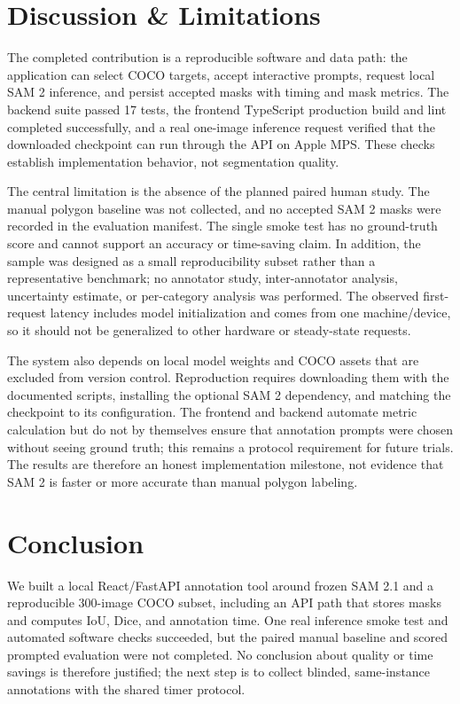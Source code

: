 \documentclass[11pt]{article}
\begin{document}
\section{Discussion \& Limitations}
\label{sec:discussion}
The completed contribution is a reproducible software and data path: the
application can select COCO targets, accept interactive prompts, request local
SAM 2 inference, and persist accepted masks with timing and mask metrics. The
backend suite passed 17 tests, the frontend TypeScript production build and
lint completed successfully, and a real one-image inference request verified
that the downloaded checkpoint can run through the API on Apple MPS. These
checks establish implementation behavior, not segmentation quality.

The central limitation is the absence of the planned paired human study. The
manual polygon baseline was not collected, and no accepted SAM 2 masks were
recorded in the evaluation manifest. The single smoke test has no ground-truth
score and cannot support an accuracy or time-saving claim. In addition, the
sample was designed as a small reproducibility subset rather than a
representative benchmark; no annotator study, inter-annotator analysis,
uncertainty estimate, or per-category analysis was performed. The observed
first-request latency includes model initialization and comes from one
machine/device, so it should not be generalized to other hardware or
steady-state requests.

The system also depends on local model weights and COCO assets that are
excluded from version control. Reproduction requires downloading them with the
documented scripts, installing the optional SAM 2 dependency, and matching the
checkpoint to its configuration. The frontend and backend automate metric
calculation but do not by themselves ensure that annotation prompts were
chosen without seeing ground truth; this remains a protocol requirement for
future trials. The results are therefore an honest implementation milestone,
not evidence that SAM 2 is faster or more accurate than manual polygon
labeling.

\section{Conclusion}
\label{sec:conclusion}
We built a local React/FastAPI annotation tool around frozen SAM 2.1 and a
reproducible 300-image COCO subset, including an API path that stores masks and
computes IoU, Dice, and annotation time. One real inference smoke test and
automated software checks succeeded, but the paired manual baseline and scored
prompted evaluation were not completed. No conclusion about quality or time
savings is therefore justified; the next step is to collect blinded,
same-instance annotations with the shared timer protocol.
\end{document}
